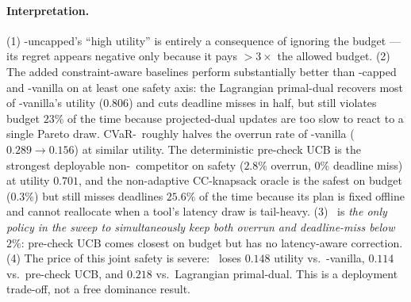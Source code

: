 \paragraph{Interpretation.}
(1) \ReAct-uncapped's ``high utility'' is entirely a consequence of
ignoring the budget --- its regret appears negative only because it
pays $>3\times$ the allowed budget. (2) The added constraint-aware
baselines perform substantially better than \ReAct-capped and
\BwK-vanilla on at least one safety axis: the Lagrangian primal-dual
recovers most of \BwK-vanilla's utility ($0.806$) and cuts deadline
misses in half, but still violates budget $23\%$ of the time because
projected-dual updates are too slow to react to a single Pareto draw.
CVaR-\BwK~roughly halves the overrun rate of \BwK-vanilla ($0.289
\to 0.156$) at similar utility. The deterministic pre-check UCB is
the strongest deployable non-\CBUC~competitor on safety ($2.8\%$
overrun, $0\%$ deadline miss) at utility $0.701$, and the non-adaptive
CC-knapsack oracle is the safest on budget ($0.3\%$) but still misses
deadlines $25.6\%$ of the time because its plan is fixed offline and
cannot reallocate when a tool's latency draw is tail-heavy.
(3) \CBUC~is \emph{the only policy in the sweep to simultaneously
keep both overrun and deadline-miss below $2\%$}: pre-check UCB comes
closest on budget but has no latency-aware correction. (4) The price
of this joint safety is severe: \CBUC~loses $0.148$ utility vs.\
\BwK-vanilla, $0.114$ vs.\ pre-check UCB, and $0.218$ vs.\ Lagrangian
primal-dual. This is a deployment trade-off, not a free dominance
result.

